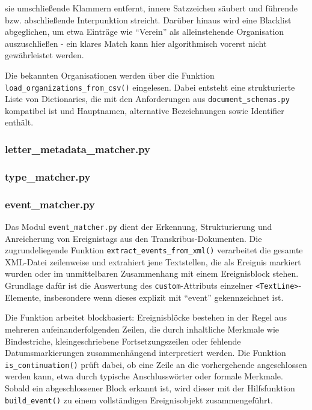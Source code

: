 \documentclass[12pt, a4paper, ngerman, bidi=default]{article}
\newcommand{\code}[1]{\colorbox{VeryLightGray}{\texttt{#1}}} %
\begin{document}
sie umschließende Klammern entfernt, innere Satzzeichen säubert und führende bzw. abschließende Interpunktion streicht. Darüber hinaus wird eine Blacklist abgeglichen, um etwa Einträge wie \enquote{Verein} als alleinstehende Organisation auszuschließen - ein klares Match kann hier algorithmisch vorerst nicht gewährleistet werden.

Die bekannten Organisationen werden über die Funktion \code{load\_organizations\_from\_csv()} eingelesen. Dabei entsteht eine strukturierte Liste von Dictionaries, die mit den Anforderungen aus \code{document\_schemas.py} kompatibel ist und Hauptnamen, alternative Bezeichnungen sowie Identifier enthält.



\subsubsection{letter\_metadata\_matcher.py}\label{subsection:letter_metadata_matcher}

\subsubsection{type\_matcher.py}\label{subsection:type_matcher}


\subsubsection*{event\_matcher.py}\label{subsection:event_matcher}

Das Modul \texttt{event\_matcher.py} dient der Erkennung, Strukturierung und Anreicherung von 
Ereignistags aus den Transkribus-Dokumenten. Die zugrundeliegende Funktion \texttt{extract\_events\_from\_xml()} 
verarbeitet die gesamte XML-Datei zeilenweise und extrahiert jene Textstellen, die als Ereignis markiert 
wurden oder im unmittelbaren Zusammenhang mit einem Ereignisblock stehen. Grundlage dafür ist die Auswertung 
des \texttt{custom}-Attributs einzelner \texttt{<TextLine>}-Elemente, insbesondere wenn dieses explizit mit 
\enquote{event} gekennzeichnet ist.

Die Funktion arbeitet blockbasiert: Ereignisblöcke bestehen in der Regel aus mehreren aufeinanderfolgenden 
Zeilen, die durch inhaltliche Merkmale wie Bindestriche, kleingeschriebene Fortsetzungszeilen oder fehlende 
Datumsmarkierungen zusammenhängend interpretiert werden. Die Funktion \texttt{is\_continuation()} prüft dabei, 
ob eine Zeile an die vorhergehende angeschlossen werden kann, etwa durch typische Anschlusswörter oder formale Merkmale. 
Sobald ein abgeschlossener Block erkannt ist, wird dieser mit der Hilfsfunktion \texttt{build\_event()} zu einem 
vollständigen Ereignisobjekt zusammengeführt.
\end{document}
